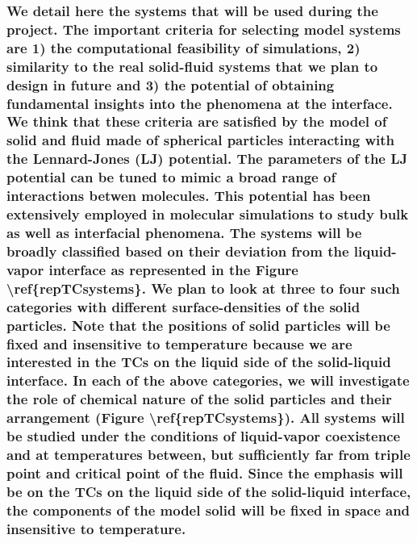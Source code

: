 \subsubsection{We detail here the systems that will be used during the project.  The important criteria for selecting model systems are 1) the computational feasibility of simulations, 2) similarity to the real solid-fluid systems that we plan to design in future and 3) the potential of obtaining fundamental insights into the phenomena at the interface. We think that these criteria are satisfied by the model of solid and fluid made of spherical particles interacting with the Lennard-Jones (LJ) potential. The parameters of the LJ potential can be tuned to mimic a broad range of interactions betwen molecules. This potential has been extensively employed in molecular simulations to study bulk as well as interfacial phenomena. The systems will be broadly classified based on their deviation from the liquid-vapor interface as represented in the Figure \textbackslash ref\{repTCsystems\}. We plan to look at three to four such categories with different surface-densities of the solid particles. Note that the positions of solid particles will be fixed and insensitive to temperature because we are interested in the TCs on the liquid side of the solid-liquid interface. In each of the above categories, we will investigate the role of chemical nature of the solid particles and their arrangement (Figure \textbackslash ref\{repTCsystems\}). All systems will be studied under the conditions of liquid-vapor coexistence and at temperatures between, but sufficiently far from triple point and critical point of the fluid. Since the emphasis will be on the TCs on the liquid side of the solid-liquid interface, the components of the model solid will be fixed in space and insensitive to temperature.}

